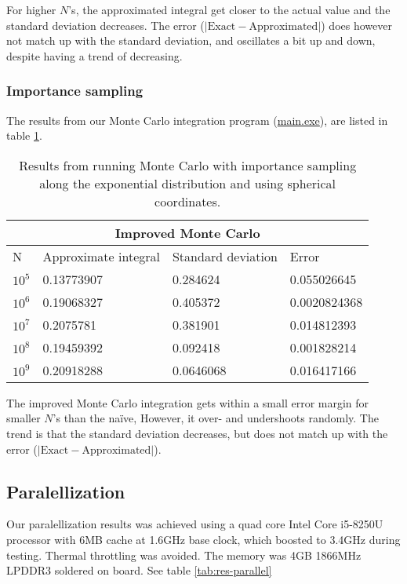 \documentclass[../main.tex]{subfiles}
\begin{document}
For higher $N$'s, the approximated integral get closer to the actual value and the standard deviation decreases. The error ($|\text{Exact}-\text{Approximated}|$) does however not match up with the standard deviation, and oscillates a bit up and down, despite having a trend of decreasing.

\subsubsection{Importance sampling}
The results from our Monte Carlo integration program (\href{https://github.com/kmaasrud/Project-3/blob/master/code/Monte-Carlo/main.exe}{main.exe}), are listed in table \ref{tab:res-impsamp}.

\begin{table}[h!]
  \begin{center}
    \begin{tabular}{|p{1cm}|p{3.5cm}|p{3cm}|p{3cm}|}
      \hline
      \multicolumn{4}{|c|}{\textbf{Improved Monte Carlo}} \\
      \hline
      N   & Approximate integral & Standard deviation & Error\\
      \hline
      $10^5$ &  0.13773907 &  0.284624 & 0.055026645\\
      $10^6$ &  0.19068327 &  0.405372 & 0.0020824368\\
      $10^7$ &  0.2075781 &  0.381901  & 0.014812393\\
      $10^8$ &  0.19459392 &  0.092418  & 0.001828214\\
      $10^9$ &  0.20918288 &  0.0646068 & 0.016417166\\
      \hline
    \end{tabular}
    \caption{Results from running Monte Carlo with importance sampling along the exponential distribution and using spherical coordinates.}
    \label{tab:res-impsamp}
  \end{center}
\end{table}
\FloatBarrier
The improved Monte Carlo integration gets within a small error margin for smaller $N$'s than the naïve, However, it over- and undershoots randomly. The trend is that the standard deviation decreases, but does not match up with the error ($|\text{Exact}-\text{Approximated}|$).

\subsection{Paralellization} \label{sec:res-paralell}
Our paralellization results was achieved using a quad core Intel Core i5-8250U processor with 6MB cache at 1.6GHz base clock, which boosted to 3.4GHz during testing. Thermal throttling was avoided.
The memory was 4GB 1866MHz LPDDR3 soldered on board. See table \ref{tab:res-parallel}
\end{document}
